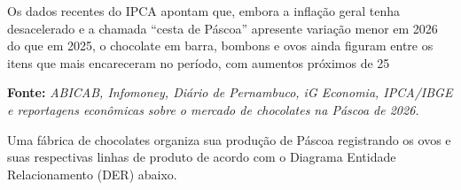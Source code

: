 \documentclass[12pt,a4paper]{article}
\begin{document}
\begin{enumerate}
Os dados recentes do IPCA apontam que, embora a inflação geral tenha desacelerado e a chamada “cesta de Páscoa” apresente variação menor em 2026 do que em 2025, o chocolate em barra, bombons e ovos ainda figuram entre os itens que mais encareceram no período, com aumentos próximos de 25%

\noindent \textbf{Fonte:} \textit{ABICAB, Infomoney, Diário de Pernambuco, iG Economia, IPCA/IBGE e reportagens econômicas sobre o mercado de chocolates na Páscoa de 2026.}
    
    
    Uma fábrica de chocolates organiza sua produção de Páscoa registrando os ovos e suas respectivas linhas de produto de acordo com o Diagrama Entidade Relacionamento (DER) abaixo.

\begin{center}
\end{center}




\end{enumerate}
\end{document}
